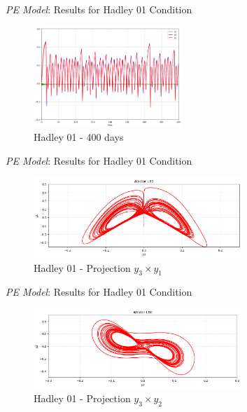 
\begin{frame}{\textit{PE Model}: Results for Hadley 01 Condition}
	\begin{figure}
		\centering
		\includegraphics[width=0.5\textwidth]{img/p02d260.png}
		\caption{Hadley 01 - 400 days}
		\label{fig:p02}
	\end{figure}
\end{frame}


\begin{frame}{\textit{PE Model}: Results for Hadley 01 Condition}
	\begin{figure}
		\centering
		\includegraphics[width=0.7\textwidth]{img/p02y3y1.png}
		\caption{Hadley 01 - Projection $y_3 \times y_1$}
		\label{fig:p02y3y1}
	\end{figure}
\end{frame}


\begin{frame}{\textit{PE Model}: Results for Hadley 01 Condition}
	\begin{figure}
		\centering
		\includegraphics[width=0.7\textwidth]{img/p02y3y2.png}
		\caption{Hadley 01 - Projection $y_3 \times y_2$}
		\label{fig:p02y3y2}
	\end{figure}
\end{frame}

